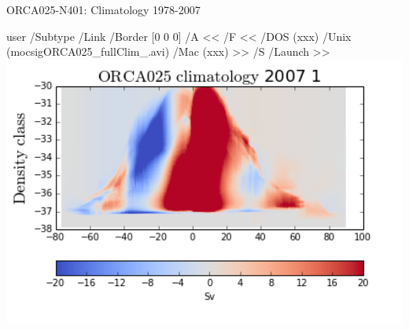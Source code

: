 \documentclass{beamer}
\newcommand{\LaunchBinary}[2]{%
  \leavevmode%
  \pdfstartlink user {
    /Subtype /Link
    /Border [0 0 0]%
    /A <<
      /F <<
         /DOS (xxx)
         /Unix (#1)
         /Mac (xxx)
      >>
      /S /Launch
    >>
  }#2%
  \pdfendlink%
}
\begin{document}
\begin{frame}{ORCA025-N401: Climatology 1978-2007}
\begin{center}
\LaunchBinary{mocsigORCA025_fullClim_.avi}{\includegraphics[width=1\textwidth]{mocsigORCA025_fullClim_1.png}}%
\end{center}
\end{frame}
\end{document}
